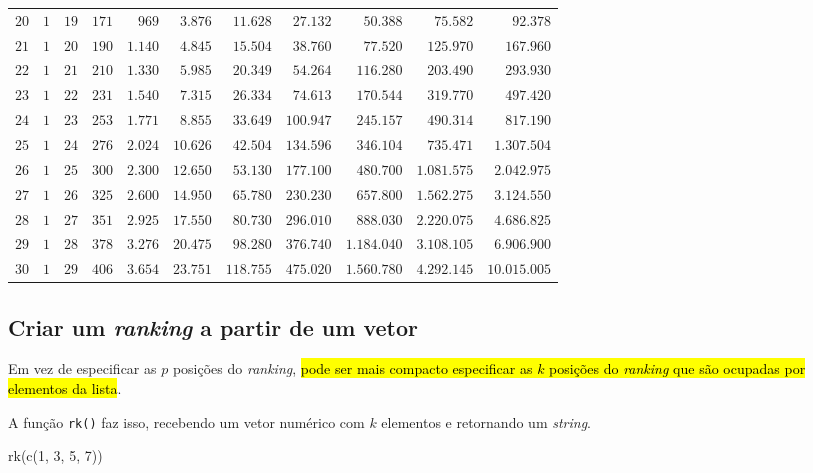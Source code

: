 \documentclass[
  letterpaper,
  DIV=11,
  numbers=noendperiod]{scrreprt}
\newenvironment{Shaded}{\begin{snugshade}}{\end{snugshade}}
\newcommand{\DecValTok}[1]{\textcolor[rgb]{0.68,0.00,0.00}{#1}}
\newcommand{\FunctionTok}[1]{\textcolor[rgb]{0.28,0.35,0.67}{#1}}
\newcommand{\NormalTok}[1]{\textcolor[rgb]{0.00,0.23,0.31}{#1}}
\begin{document}
\begin{longtable*}{l|rrrrrrrrrr}
$20$ & $1$ & $19$ & $171$ & $969$ & $3.876$ & $11.628$ & $27.132$ & $50.388$ & $75.582$ & $92.378$ \\ 
$21$ & $1$ & $20$ & $190$ & $1.140$ & $4.845$ & $15.504$ & $38.760$ & $77.520$ & $125.970$ & $167.960$ \\ 
$22$ & $1$ & $21$ & $210$ & $1.330$ & $5.985$ & $20.349$ & $54.264$ & $116.280$ & $203.490$ & $293.930$ \\ 
$23$ & $1$ & $22$ & $231$ & $1.540$ & $7.315$ & $26.334$ & $74.613$ & $170.544$ & $319.770$ & $497.420$ \\ 
$24$ & $1$ & $23$ & $253$ & $1.771$ & $8.855$ & $33.649$ & $100.947$ & $245.157$ & $490.314$ & $817.190$ \\ 
$25$ & $1$ & $24$ & $276$ & $2.024$ & $10.626$ & $42.504$ & $134.596$ & $346.104$ & $735.471$ & $1.307.504$ \\ 
$26$ & $1$ & $25$ & $300$ & $2.300$ & $12.650$ & $53.130$ & $177.100$ & $480.700$ & $1.081.575$ & $2.042.975$ \\ 
$27$ & $1$ & $26$ & $325$ & $2.600$ & $14.950$ & $65.780$ & $230.230$ & $657.800$ & $1.562.275$ & $3.124.550$ \\ 
$28$ & $1$ & $27$ & $351$ & $2.925$ & $17.550$ & $80.730$ & $296.010$ & $888.030$ & $2.220.075$ & $4.686.825$ \\ 
$29$ & $1$ & $28$ & $378$ & $3.276$ & $20.475$ & $98.280$ & $376.740$ & $1.184.040$ & $3.108.105$ & $6.906.900$ \\ 
$30$ & $1$ & $29$ & $406$ & $3.654$ & $23.751$ & $118.755$ & $475.020$ & $1.560.780$ & $4.292.145$ & $10.015.005$ \\ 
\bottomrule
\end{longtable*}

\subsection{\texorpdfstring{Criar um \emph{ranking} a partir de um
vetor}{Criar um ranking a partir de um vetor}}\label{criar-um-ranking-a-partir-de-um-vetor}

Em vez de especificar as $p$ posições do \emph{ranking}, {\hl{pode ser
mais compacto especificar as $k$ posições do \emph{ranking} que são
ocupadas por elementos da lista}}.

A função \texttt{rk()} faz isso, recebendo um vetor numérico com $k$
elementos e retornando um \emph{string}.

\begin{Shaded}
\begin{Highlighting}[]
\FunctionTok{rk}\NormalTok{(}\FunctionTok{c}\NormalTok{(}\DecValTok{1}\NormalTok{, }\DecValTok{3}\NormalTok{, }\DecValTok{5}\NormalTok{, }\DecValTok{7}\NormalTok{))}
\end{Highlighting}
\end{Shaded}
\end{document}
